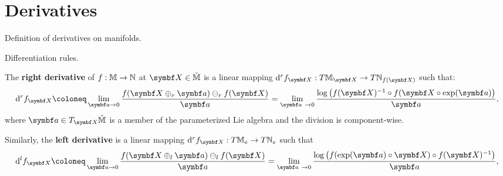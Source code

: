 
\chapter{Derivatives}

\begin{itemize_outcomes}
  \item Definition of derivatives on manifolds.
  \item Differentiation rules.
\end{itemize_outcomes}


\begin{definition}
  The \textbf{right derivative} of $f : \mathbb{M} \rightarrow \mathbb{N}$ at $\X \in {\cM}$ is a linear mapping $\mathrm{d}^r f_\X : T {\M}_{\X} \rightarrow T \N_{f(\X)}$ such that:
  \begin{equation}
    \label{eq:deriv_rght}
    \mathrm{d}^r f_\X \coloneq \lim_{\a \rightarrow 0} \frac{f( \X \oplus_r\a) \ominus_r f(\X)}{\a} = \lim_{\a\ \rightarrow 0} \frac{\log \left( f(\X)^{-1} \circ  f(\X \circ \exp(\a) \right)}{\a},
  \end{equation}
  where $\a \in T_\X \check{\M}$ is a member of the parameterized Lie algebra and the division is component-wise.

  Similarly, the \textbf{left derivative} is a linear mapping $\mathrm{d}^r f_\X : T {\M}_{e} \rightarrow T \N_{e}$ such that
  \begin{equation}
    \label{eq:deriv_left}
    \mathrm{d}^l f_\X \coloneq \lim_{\a \rightarrow 0} \frac{f( \X \oplus_l \a) \ominus_l  f(\X)}{\a} = \lim_{\a\ \rightarrow 0} \frac{\log \left( f(\exp(\a) \circ \X) \circ f(\X)^{-1} \right)}{\a},
  \end{equation}
\end{definition}

